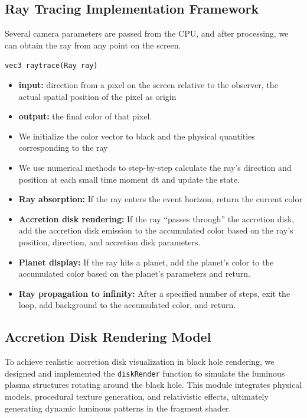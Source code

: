 \documentclass[11pt,a4paper]{article}
\begin{document}
\subsection{Ray Tracing Implementation Framework}

Several camera parameters are passed from the CPU, and after processing, we can obtain the ray from any point on the screen.

\texttt{vec3 raytrace(Ray ray)}

\begin{itemize}
    \item \textbf{input:} direction from a pixel on the screen relative to the observer, the actual spatial position of the pixel as origin
    \item \textbf{output:} the final color of that pixel.
    \item We initialize the color vector to black and the physical quantities corresponding to the ray
    \item We use numerical methods to step-by-step calculate the ray's direction and position at each small time moment dt and update the state.
    \item \textbf{Ray absorption:} If the ray enters the event horizon, return the current color
    \item \textbf{Accretion disk rendering:} If the ray ``passes through'' the accretion disk, add the accretion disk emission to the accumulated color based on the ray's position, direction, and accretion disk parameters.
    \item \textbf{Planet display:} If the ray hits a planet, add the planet's color to the accumulated color based on the planet's parameters and return.
    \item \textbf{Ray propagation to infinity:} After a specified number of steps, exit the loop, add background to the accumulated color, and return.
\end{itemize}

\subsection{Accretion Disk Rendering Model}

To achieve realistic accretion disk visualization in black hole rendering, we designed and implemented the \texttt{diskRender} function to simulate the luminous plasma structures rotating around the black hole. This module integrates physical models, procedural texture generation, and relativistic effects, ultimately generating dynamic luminous patterns in the fragment shader.
\end{document}
